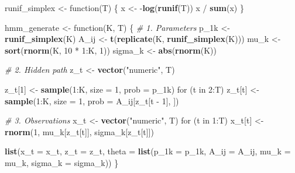 \documentclass[]{article}
\newenvironment{Shaded}{\begin{snugshade}}{\end{snugshade}}
\newcommand{\KeywordTok}[1]{\textcolor[rgb]{0.13,0.29,0.53}{\textbf{{#1}}}}
\newcommand{\DataTypeTok}[1]{\textcolor[rgb]{0.13,0.29,0.53}{{#1}}}
\newcommand{\DecValTok}[1]{\textcolor[rgb]{0.00,0.00,0.81}{{#1}}}
\newcommand{\StringTok}[1]{\textcolor[rgb]{0.31,0.60,0.02}{{#1}}}
\newcommand{\CommentTok}[1]{\textcolor[rgb]{0.56,0.35,0.01}{\textit{{#1}}}}
\newcommand{\NormalTok}[1]{{#1}}
\begin{document}
\begin{Shaded}
\begin{Highlighting}[]
\NormalTok{runif_simplex <-}\StringTok{ }\NormalTok{function(T) \{}
  \NormalTok{x <-}\StringTok{ }\NormalTok{-}\KeywordTok{log}\NormalTok{(}\KeywordTok{runif}\NormalTok{(T))}
  \NormalTok{x /}\StringTok{ }\KeywordTok{sum}\NormalTok{(x)}
\NormalTok{\}}

\NormalTok{hmm_generate <-}\StringTok{ }\NormalTok{function(K, T) \{}
  \CommentTok{# 1. Parameters}
  \NormalTok{p_1k <-}\StringTok{ }\KeywordTok{runif_simplex}\NormalTok{(K)}
  \NormalTok{A_ij <-}\StringTok{ }\KeywordTok{t}\NormalTok{(}\KeywordTok{replicate}\NormalTok{(K, }\KeywordTok{runif_simplex}\NormalTok{(K)))}
  \NormalTok{mu_k <-}\StringTok{ }\KeywordTok{sort}\NormalTok{(}\KeywordTok{rnorm}\NormalTok{(K, }\DecValTok{10} \NormalTok{*}\StringTok{ }\DecValTok{1}\NormalTok{:K, }\DecValTok{1}\NormalTok{))}
  \NormalTok{sigma_k <-}\StringTok{ }\KeywordTok{abs}\NormalTok{(}\KeywordTok{rnorm}\NormalTok{(K))}

  \CommentTok{# 2. Hidden path}
  \NormalTok{z_t <-}\StringTok{ }\KeywordTok{vector}\NormalTok{(}\StringTok{"numeric"}\NormalTok{, T)}

  \NormalTok{z_t[}\DecValTok{1}\NormalTok{] <-}\StringTok{ }\KeywordTok{sample}\NormalTok{(}\DecValTok{1}\NormalTok{:K, }\DataTypeTok{size =} \DecValTok{1}\NormalTok{, }\DataTypeTok{prob =} \NormalTok{p_1k)}
  \NormalTok{for (t in }\DecValTok{2}\NormalTok{:T)}
    \NormalTok{z_t[t] <-}\StringTok{ }\KeywordTok{sample}\NormalTok{(}\DecValTok{1}\NormalTok{:K, }\DataTypeTok{size =} \DecValTok{1}\NormalTok{, }\DataTypeTok{prob =} \NormalTok{A_ij[z_t[t -}\StringTok{ }\DecValTok{1}\NormalTok{], ])}

  \CommentTok{# 3. Observations}
  \NormalTok{x_t <-}\StringTok{ }\KeywordTok{vector}\NormalTok{(}\StringTok{"numeric"}\NormalTok{, T)}
  \NormalTok{for (t in }\DecValTok{1}\NormalTok{:T)}
    \NormalTok{x_t[t] <-}\StringTok{ }\KeywordTok{rnorm}\NormalTok{(}\DecValTok{1}\NormalTok{, mu_k[z_t[t]], sigma_k[z_t[t]])}

  \KeywordTok{list}\NormalTok{(}\DataTypeTok{x_t =} \NormalTok{x_t, }\DataTypeTok{z_t =} \NormalTok{z_t,}
       \DataTypeTok{theta =} \KeywordTok{list}\NormalTok{(}\DataTypeTok{p_1k =} \NormalTok{p_1k, }\DataTypeTok{A_ij =} \NormalTok{A_ij,}
                    \DataTypeTok{mu_k =} \NormalTok{mu_k, }\DataTypeTok{sigma_k =} \NormalTok{sigma_k))}
\NormalTok{\}}
\end{Highlighting}
\end{Shaded}
\end{document}
